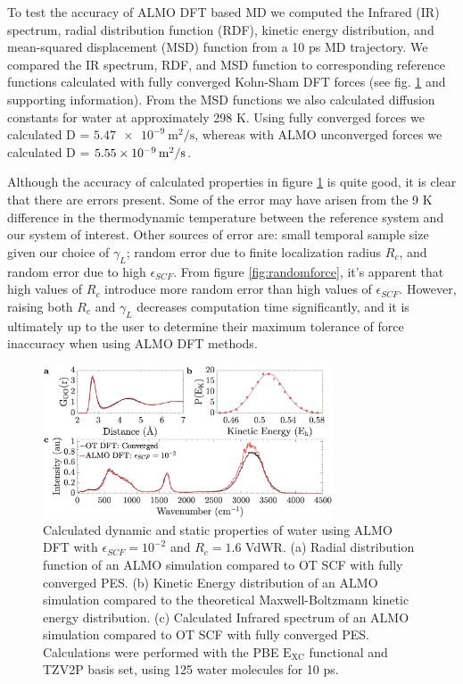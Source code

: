 \documentclass[10pt,aps,prl,twocolumn,amsmath,amssymb,superscriptaddress,longbibliography]{revtex4-1}
\begin{document}
To test the accuracy of ALMO DFT based MD we computed the Infrared (IR) spectrum, radial distribution function (RDF), kinetic energy distribution, and mean-squared displacement (MSD) function from a 10 ps MD trajectory. 
We compared the IR spectrum, RDF, and MSD function to corresponding reference functions calculated with fully converged Kohn-Sham DFT forces (see fig. \ref{fig:dynproperties} and supporting information).
From the MSD functions we also calculated diffusion constants for water at approximately 298 K.
Using fully converged forces we calculated D = $\SI{5.47e-9}{\m^{2}\per\s}$, whereas with ALMO unconverged forces we calculated D = $\SI{5.55E-09}{\m^{2}\per\s}$.

Although the accuracy of calculated properties in figure \ref{fig:dynproperties} is quite good, it is clear that there are errors present.
Some of the error may have arisen from the 9 K difference in the thermodynamic temperature between the reference system and our system of interest.
Other sources of error are: small temporal sample size given our choice of $\gamma_L$; random error due to finite localization radius $R_{c}$, and random error due to high $\epsilon_{SCF}$.
From figure \ref{fig:randomforce}, it's apparent that high values of $R_{c}$ introduce more random error than high values of $\epsilon_{SCF}$.
However, raising both $R_{c}$ and $\gamma_L$ decreases computation time significantly, and it is ultimately up to the user to determine their maximum tolerance of force inaccuracy when using ALMO DFT methods.

\begin{figure}
\includegraphics[trim={1.3cm 0.1cm 3.3cm 1.3cm},clip,width=8.6cm]{Dynamical_Data_Tiled.eps}
\caption{\label{fig:dynproperties} Calculated dynamic and static properties of water using ALMO DFT with $\epsilon_{SCF} = 10^{-2}$ and $R_{c} = 1.6$ VdWR.
(a) Radial distribution function of an ALMO simulation compared to OT SCF with fully converged PES. 
(b) Kinetic Energy distribution of an ALMO simulation compared to the theoretical Maxwell-Boltzmann kinetic energy distribution.
(c) Calculated Infrared spectrum of an ALMO simulation compared to OT SCF with fully converged PES.
Calculations were performed with the PBE $\mathrm{E_{XC}}$ functional and TZV2P basis set, using 125 water molecules for 10 ps.}
\end{figure}
\end{document}
